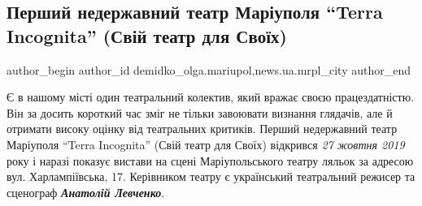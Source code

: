  
 
 
 
 
 
\subsection{Перший недержавний театр Маріуполя \enquote{Terra Incognita} (Свій театр для Своїх)}
\label{sec:29_03_2021.stz.news.ua.mrpl_city.1.terra_incognita_svij_teatr_dlja_svoih}
 
\ifcmt
 author_begin
   author_id demidko_olga.mariupol,news.ua.mrpl_city
 author_end
\fi


Є в нашому місті один театральний колектив, який вражає своєю працездатністю.
Він за досить короткий час зміг не тільки завоювати визнання глядачів, але й
отримати високу оцінку від театральних критиків. Перший недержавний театр
Маріуполя \enquote{Terra Incognita} (Свій театр для Своїх) відкрився \emph{27 жовтня 2019}
року і наразі показує вистави на сцені Маріупольського театру ляльок за адресою
вул. Харлампіївська, 17. Керівником театру є український театральний режисер та
сценограф \emph{\textbf{Анатолій Левченко}}.

